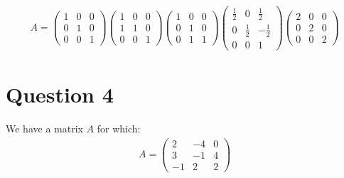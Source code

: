 \documentclass[12pt]{article}
\begin{document}
\begin{align*}
A=
\left(\begin{array}{ccc}
1 & 0 & 0 \\
0 & 1 & 0 \\
0 & 0 & 1
\end{array}\right)
\left(\begin{array}{ccc}
1 & 0 & 0 \\
1 & 1 & 0 \\
0 & 0 & 1
\end{array}\right)
\left(\begin{array}{ccc}
1 & 0 & 0 \\
0 & 1 & 0 \\
0 & 1 & 1
\end{array}\right)
\left(\begin{array}{ccc}
\frac{1}{2} & 0 & \frac{1}{2} \\
0 & \frac{1}{2} & -\frac{1}{2} \\
0 & 0 & 1
\end{array}\right)
\left(\begin{array}{ccc}
2 & 0 & 0 \\
0 & 2 & 0 \\
0 & 0 & 2
\end{array}\right)
\end{align*}

\newpage

\section{Question 4}
We have a matrix $A$ for which: 
\begin{align*}
A=
\left(\begin{array}{ccc}
2 & -4 & 0 \\
3 & -1 & 4 \\
-1 & 2 & 2
\end{array}\right)
\end{align*}
\end{document}
